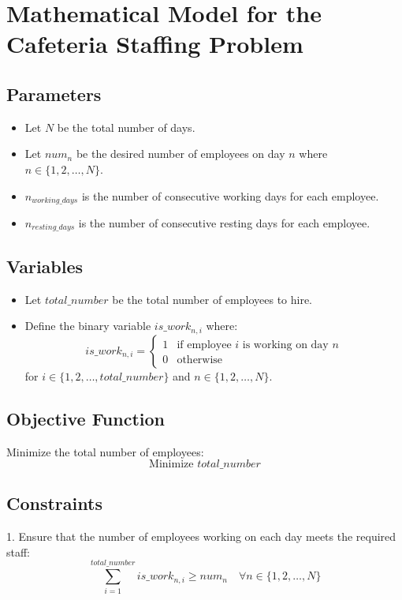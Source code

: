 \documentclass{article}
\begin{document}
\section*{Mathematical Model for the Cafeteria Staffing Problem}

\subsection*{Parameters}
\begin{itemize}
    \item Let \( N \) be the total number of days.
    \item Let \( num_n \) be the desired number of employees on day \( n \) where \( n \in \{1, 2, \ldots, N\} \).
    \item \( n_{working\_days} \) is the number of consecutive working days for each employee.
    \item \( n_{resting\_days} \) is the number of consecutive resting days for each employee.
\end{itemize}

\subsection*{Variables}
\begin{itemize}
    \item Let \( total\_number \) be the total number of employees to hire.
    \item Define the binary variable \( is\_work_{n,i} \) where:
    \[
    is\_work_{n,i} =
    \begin{cases}
    1 & \text{if employee } i \text{ is working on day } n \\
    0 & \text{otherwise}
    \end{cases}
    \]
    for \( i \in \{1, 2, \ldots, total\_number\} \) and \( n \in \{1, 2, \ldots, N\} \).
\end{itemize}

\subsection*{Objective Function}
Minimize the total number of employees:
\[
\text{Minimize } total\_number
\]

\subsection*{Constraints}
1. Ensure that the number of employees working on each day meets the required staff:
\[
\sum_{i=1}^{total\_number} is\_work_{n,i} \geq num_n \quad \forall n \in \{1, 2, \ldots, N\}
\]
\end{document}
